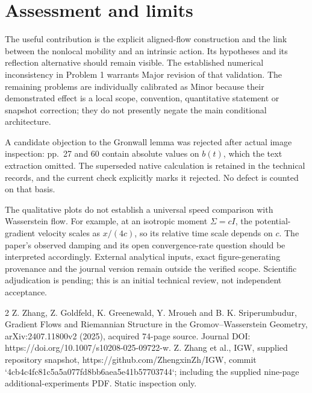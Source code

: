 \documentclass[10pt]{article}
\begin{document}
\section*{Assessment and limits}
The useful contribution is the explicit aligned-flow construction and the link between the nonlocal mobility and an intrinsic action. Its hypotheses and its reflection alternative should remain visible. The established numerical inconsistency in Problem 1 warrants Major revision of that validation. The remaining problems are individually calibrated as Minor because their demonstrated effect is a local scope, convention, quantitative statement or snapshot correction; they do not presently negate the main conditional architecture.\par
A candidate objection to the Gronwall lemma was rejected after actual image inspection: pp. 27 and 60 contain absolute values on \(b(t)\), which the text extraction omitted. The superseded native calculation is retained in the technical records, and the current check explicitly marks it rejected. No defect is counted on that basis.\par
The qualitative plots do not establish a universal speed comparison with Wasserstein flow. For example, at an isotropic moment \(\Sigma=cI\), the potential-gradient velocity scales as \(x/(4c)\), so its relative time scale depends on \(c\). The paper’s observed damping and its open convergence-rate question should be interpreted accordingly. External analytical inputs, exact figure-generating provenance and the journal version remain outside the verified scope. Scientific adjudication is pending; this is an initial technical review, not independent acceptance.\par
2 Z. Zhang, Z. Goldfeld, K. Greenewald, Y. Mroueh and B. K. Sriperumbudur, Gradient Flows and Riemannian Structure in the Gromov–Wasserstein Geometry, arXiv:2407.11800v2 (2025), acquired 74-page source. Journal DOI: https://doi.org/10.1007/s10208-025-09722-w. Z. Zhang et al., IGW, supplied repository snapshot, https://github.com/ZhengxinZh/IGW, commit `4cb4c4fc81c5a5a077fd8bb6aea5e41b57703744`; including the supplied nine-page additional-experiments PDF. Static inspection only.\par
\end{document}
